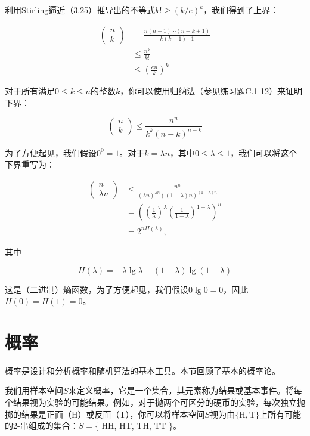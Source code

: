 \documentclass[lang=cn,newtx,10pt,scheme=chinese]{elegantbook}
\begin{document}
利用Stirling逼近（3.25）推导出的不等式$k ! \geq(k / e)^k$，我们得到了上界：

$$
\begin{aligned}
\left(\begin{array}{l}
n \\
k
\end{array}\right) & =\frac{n(n-1) \cdots(n-k+1)}{k(k-1) \cdots 1} \\
& \leq \frac{n^k}{k !} \\
& \leq\left(\frac{e n}{k}\right)^k
\end{aligned}
$$

对于所有满足$0 \leq k \leq n$的整数$k$，你可以使用归纳法（参见练习题C.1-12）来证明下界：

$$
\left(\begin{array}{l}
n \\
k
\end{array}\right) \leq \frac{n^n}{k^k(n-k)^{n-k}}
$$

为了方便起见，我们假设$0^0=1$。对于$k=\lambda n$，其中$0 \leq \lambda \leq 1$，我们可以将这个下界重写为：

$$
\begin{aligned}
\left(\begin{array}{c}
n \\
\lambda n
\end{array}\right) & \leq \frac{n^n}{(\lambda n)^{\lambda n}((1-\lambda) n)^{(1-\lambda) n}} \\
& =\left(\left(\frac{1}{\lambda}\right)^\lambda\left(\frac{1}{1-\lambda}\right)^{1-\lambda}\right)^n \\
& =2^{n H(\lambda)},
\end{aligned}
$$

其中

$$
H(\lambda)=-\lambda \lg \lambda-(1-\lambda) \lg (1-\lambda)
$$

这是（二进制）熵函数，为了方便起见，我们假设$0 \lg 0=0$，因此$H(0)=H(1)=0$。

\section{概率}\label{section:C.2}

概率是设计和分析概率和随机算法的基本工具。本节回顾了基本的概率论。

我们用样本空间$S$来定义概率，它是一个集合，其元素称为结果或基本事件。将每个结果视为实验的可能结果。例如，对于抛两个可区分的硬币的实验，每次独立抛掷的结果是正面（$\mathrm{H}$）或反面（$\mathrm{T}$），你可以将样本空间$S$视为由$\{\mathrm{H}, \mathrm{T}\}$上所有可能的2-串组成的集合：$S=\{$ HH, HT, TH, TT $\}$。
\end{document}
